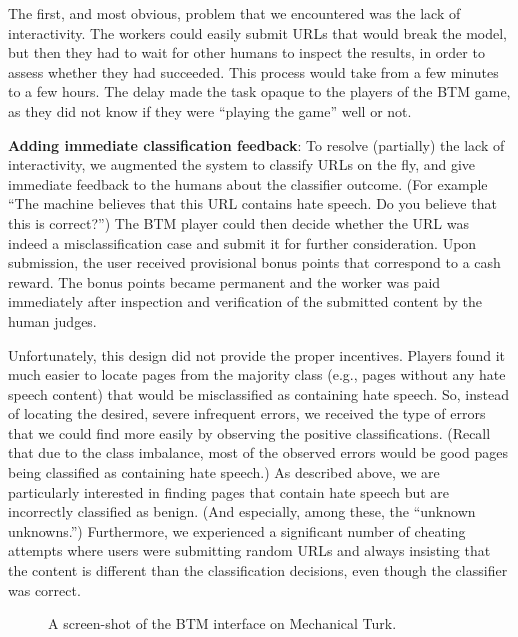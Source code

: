 The first, and most obvious, problem that we encountered was the lack of interactivity.  The workers could easily submit URLs that would break the model, but then they had to wait for other humans to inspect the results, in order to assess whether they had succeeded. This process would take from a few minutes to a few hours. The delay made the task opaque to the players of the BTM game,
as they did not know if they were ``playing the game'' well or not.

\textbf{Adding immediate classification feedback}: To resolve (partially) the lack of interactivity, we augmented the system to classify URLs on the fly, and give immediate feedback to the humans about the classifier outcome. (For example ``The machine believes that this URL contains hate speech.  Do you believe that this is correct?'') The BTM player could then decide whether the URL was indeed a misclassification case and submit it for further consideration. Upon submission, the user received provisional bonus points that correspond to a cash reward. The bonus points became permanent and the worker was paid immediately after inspection and verification of the submitted content by the human judges.
  

Unfortunately, this design did not provide the proper incentives. Players found it much easier to locate pages from the majority class (e.g., pages without any hate speech content) that would be misclassified as containing hate speech. So, instead of locating the desired, severe infrequent errors, we received the type of errors that we could find more easily by observing the positive classifications.  (Recall that due to the class imbalance, most of the observed errors would be good pages being classified as containing hate speech.) As described above, we are particularly interested in finding pages that contain hate speech but are incorrectly classified as benign.  (And especially, among these, the ``unknown unknowns.'') Furthermore, we experienced a significant number of cheating attempts where users were submitting random URLs and always insisting that the content is different than the classification decisions, even though the classifier was correct.

\begin{figure}[t]
\vspace{-.3in}
\caption{A screen-shot of the BTM interface on Mechanical Turk.}
\vspace{-.2in}
\label{fig:btm}
\end{figure}

